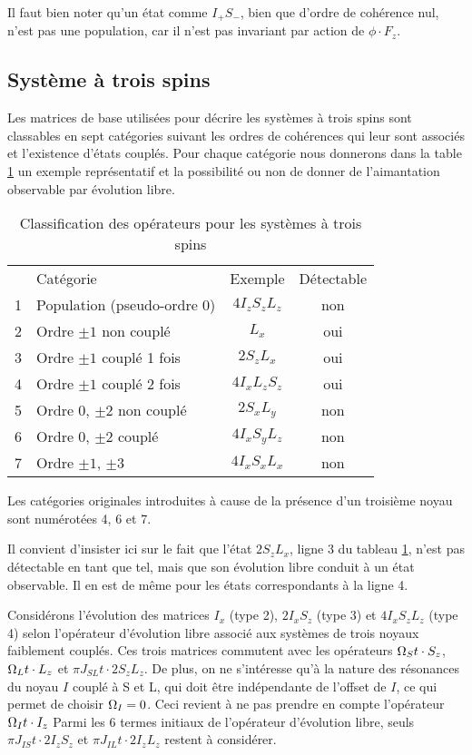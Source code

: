 Il faut bien noter qu'un état comme $I_+S_-$, bien que d'ordre de cohérence nul,
n'est pas une population, car il n'est pas invariant par action de $\phi \cdot F_z$.

\subsection{Système à trois spins}
Les matrices de base utilisées pour décrire les systèmes à trois spins sont classables en 
sept catégories suivant les ordres de cohérences qui leur sont associés et l'existence 
d'états couplés.
Pour chaque catégorie nous donnerons dans la table \ref{tab:isl}
un exemple représentatif et la 
possibilité ou non de donner de l'aimantation observable
par évolution libre.

\begin{table}[hbt]
\begin{center}
\begin{tabular}{llcc}
 & Catégorie & Exemple & Détectable\\[0.5ex] 
1 & Population (pseudo-ordre 0) & $4I_zS_zL_z$ & non \\
2 & Ordre $\pm 1$ non couplé & $L_x$ & oui \\
3 & Ordre $\pm 1$ couplé 1 fois & $2S_zL_x$ & oui \\
4 & Ordre $\pm 1$ couplé 2 fois & $4I_xL_zS_z$ & oui \\
5 & Ordre 0, $\pm 2$ non couplé & $2S_xL_y$ & non \\
6 & Ordre 0, $\pm 2$ couplé & $4I_xS_yL_z$ & non \\
7 & Ordre $\pm 1$, $\pm 3$ & $4I_xS_xL_x$ & non
\end{tabular}
\caption{\label{tab:isl}Classification des opérateurs pour les systèmes à trois spins}
\end{center}
\end{table}

Les catégories originales introduites à cause de la présence d'un troisième noyau sont 
numérotées 4, 6 et 7.

Il convient d'insister ici sur le fait que l'état $2S_zL_x$,
ligne 3 du tableau \ref{tab:isl},
n'est pas détectable en tant que tel, mais que son évolution libre conduit
à un état observable.
Il en est de même pour les états correspondants à la ligne 4.

Considérons l'évolution des matrices $I_x$ (type 2), $2I_xS_z$ (type 3)
et $4I_xS_zL_z$ (type 4) selon l'opérateur 
d'évolution libre associé aux systèmes de trois noyaux faiblement couplés. 
Ces trois matrices commutent avec les opérateurs 
$\Omega_S t \cdot S_z$, $\Omega_L t \cdot L_z$ et $\pi J_{SL} t \cdot 2S_zL_z$.
De plus, on ne s'intéresse qu'à la nature des résonances du noyau $I$ couplé à S et L, 
qui doit être indépendante de l'offset de $I$, ce qui permet de choisir $\Omega_I = 0$. 
Ceci revient à ne pas prendre en compte l'opérateur $\Omega_I t \cdot I_z$
Parmi les 6 termes initiaux de l'opérateur d'évolution libre,
seuls $\pi J_{IS} t \cdot 2I_zS_z$ et $\pi J_{IL} t \cdot 2I_zL_z$ restent à considérer.

